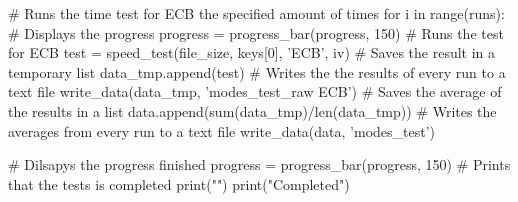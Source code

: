 \begin{python}
    # Runs the time test for ECB the specified amount of times
    for i in range(runs):
        # Displays the progress
        progress = progress_bar(progress, 150)
        # Runs the test for ECB
        test = speed_test(file_size, keys[0], 'ECB', iv)
        # Saves the result in a temporary list
        data_tmp.append(test)
    # Writes the the results of every run to a text file
    write_data(data_tmp, 'modes_test_raw ECB')
    # Saves the average of the results in a list
    data.append(sum(data_tmp)/len(data_tmp))
    # Writes the averages from every run to a text file
    write_data(data, 'modes_test')

    # Dilsapys the progress finished
    progress = progress_bar(progress, 150)
    # Prints that the tests is completed
    print("\n")
    print("Completed")

\end{python}
